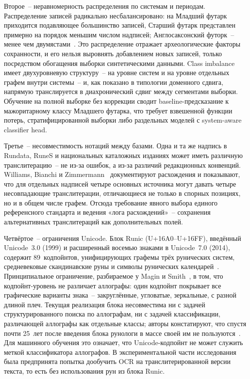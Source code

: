 \documentclass[a4paper,12pt]{extarticle}
\begin{document}
Второе~-- неравномерность распределения по системам и периодам. Распределение записей радикально несбалансировано: на Младший футарк приходится подавляющее большинство записей, Старший футарк представлен примерно на порядок меньшим числом надписей; Англосаксонский футорк~-- менее чем двумястами~\cite{page1999,riksant2024}. Это распределение отражает археологические факторы сохранности, и его нельзя выровнять добавлением новых записей, только посредством обогащения выборки синтетическими данными. Class imbalance имеет двухуровневую структуру~-- на уровне систем и на уровне отдельных графем внутри системы~-- и, как показано в типологии доменного сдвига, напрямую транслируется в диахронический сдвиг между сегментами выборки. Обучение на полной выборке без коррекции сводит baseline-предсказание к мажоритарному классу Младшего футарка, что требует взвешенной функции потерь, стратифицированной выборки либо раздельных моделей с system-aware classifier head.

Третье~-- несовместимость нотаций между базами. Одна и та же надпись в Rundata, RuneS и национальных каталожных изданиях может иметь различную транслитерацию~-- не из-за ошибок, а из-за различий редакционных конвенций. Williams, Bianchi и Zimmermann~\cite{williams2022} документируют расхождения и показывают, что для отдельных надписей четыре основных источника могут давать четыре несовпадающие транслитерации, отличающиеся не только в спорных позициях, но и в общем числе графем. Отсюда требование явного выбора единого референсного стандарта  и ведения «лога расхождений»~-- сохранения альтернативных транслитераций как дополнительных полей.

Четвёртое~-- ограничения Unicode. Блок Runic (U+16A0--U+16FF), введённый Unicode~3.0 (1999) и расширенный восемью знаками в Unicode~7.0 (2014), содержит 89~кодпойнтов, унифицирующих графемы трёх рунических систем, средневековые скандинавские руны и символы рунических календарей~\cite{unicodeRunic}. Принципиальное ограничение, разбираемое у Magin и Smith~\cite{magin2024}, в том, что кодпойнт-уровень не различает аллографы: один кодпойнт покрывает все графические варианты знака~-- закруглённые, угловатые, зеркальные, с разной длиной плеч. Текущая реализация блока несовместима ни с задачей структурированного поиска по аллографам, ни с задачей классификации, различающей аллографы как отдельные классы; авторы констатируют, что спустя почти 25~лет после введения блока рунологи в массе своей им не пользуются~\cite{magin2024}. Для машинного обучения это означает, что Unicode-кодпойнт не может служить меткой классификатора аллографов. В экспериментальной части исследования была предпринята попытка дообучить OCR на транслитерированной версии текста, то есть без использования рун из блока Runic. 
\end{document}

